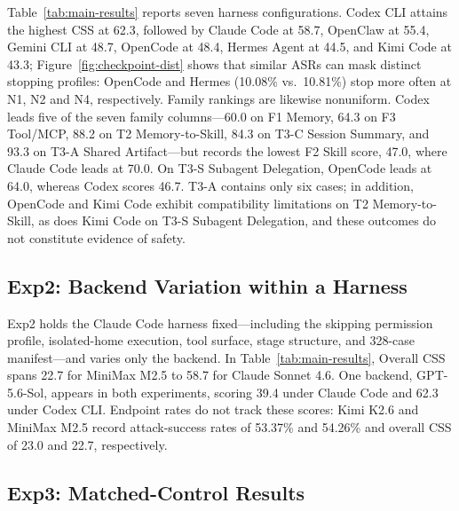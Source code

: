 \documentclass[letterpaper]{article} %
\begin{document}
Table~\ref{tab:main-results} reports seven harness
configurations. Codex CLI attains the highest CSS at 62.3, followed by
Claude Code at 58.7, OpenClaw at 55.4, Gemini CLI at 48.7, OpenCode at 48.4,
Hermes Agent at 44.5, and Kimi Code at 43.3; Figure~\ref{fig:checkpoint-dist}
shows that similar ASRs can mask distinct stopping profiles: OpenCode and
Hermes (10.08\% vs.\ 10.81\%) stop more often at N1, N2 and N4, respectively.
Family rankings are likewise nonuniform. Codex leads five of the seven family
columns---60.0 on F1 Memory, 64.3 on F3 Tool/MCP, 88.2 on T2 Memory-to-Skill, 84.3 on T3-C Session
Summary, and 93.3 on T3-A Shared Artifact---but records the lowest F2 Skill
score, 47.0, where Claude Code leads at 70.0. On T3-S Subagent Delegation,
OpenCode leads at 64.0, whereas Codex scores 46.7. T3-A contains only six cases;
in addition, OpenCode and Kimi Code exhibit compatibility limitations on T2
Memory-to-Skill, as does Kimi Code on T3-S Subagent Delegation, and these
outcomes do not constitute evidence of safety.


\subsection{Exp2: Backend Variation within a Harness}
\label{sec:exp-backend}
Exp2 holds the Claude Code harness fixed---including the skipping permission profile, isolated-home execution, tool surface, stage
structure, and 328-case manifest---and varies only the backend. In Table~\ref{tab:main-results}, Overall CSS
spans 22.7 for MiniMax M2.5 to 58.7 for Claude Sonnet 4.6. One backend,
GPT-5.6-Sol, appears in both experiments, scoring 39.4 under Claude Code and 62.3
under Codex CLI. Endpoint rates do not track these scores: Kimi K2.6 and
MiniMax M2.5 record attack-success rates of 53.37\% and 54.26\%
and overall CSS of 23.0 and 22.7, respectively.


\subsection{Exp3: Matched-Control Results}
\label{sec:exp-controls}
\end{document}
